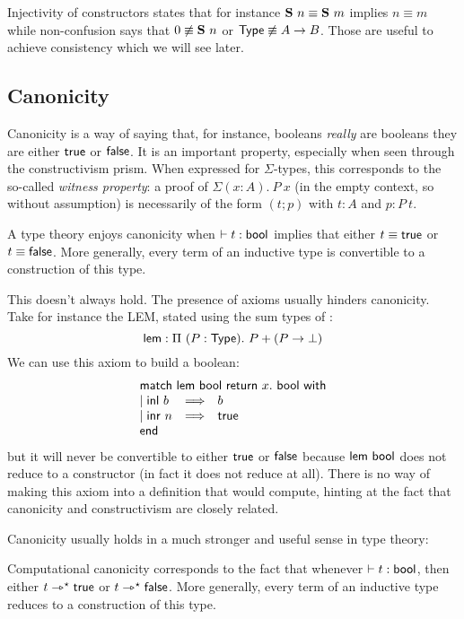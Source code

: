 Injectivity of constructors states that for instance
\(\mathbf{S}\ n \equiv \mathbf{S}\ m\) implies \(n \equiv m\) while non-confusion
says that \(0 \not\equiv \mathbf{S}\ n\) or \(\mathsf{Type} \not\equiv A \to B\).
Those are useful to achieve consistency which we will see later.

\subsection{Canonicity}

Canonicity is a way of saying that, for instance, booleans \emph{really} are
booleans \ie they are either \(\mathsf{true}\) or \(\mathsf{false}\).
It is an important property, especially when seen through the constructivism
prism.
When expressed for \(\Sigma\)-types, this corresponds to the so-called
\emph{witness property}: a proof of \(\Sigma (x:A).\ P\ x\) (in the empty
context, so without assumption) is necessarily of the form \((t;p)\)
with \(t : A\) and \(p : P\ t\).

\begin{definition}[Canonicity]
  A type theory enjoys canonicity when \(\vdash t : \mathsf{bool}\) implies that
  either \(t \equiv \mathsf{true}\) or \(t \equiv \mathsf{false}\).
  More generally, every term of an inductive type is convertible to a
  construction of this type.
\end{definition}

This doesn't always hold. The presence of axioms usually hinders canonicity.
Take for instance the \acrshort{LEM}, stated using the sum types of
:
%
\[
  \mathsf{lem} : \Pi\ (P : \mathsf{Type}).\ P + (P \to \bot)
\]
We can use this axiom to build a boolean:
\[
  \pmatch{\mathsf{lem}\ \bool}{x.\ \bool}{
    \branch{\inl\ b}{b} \\
    \branch{\inr\ n}{\ttrue}
  }
\]
but it will never be convertible to either \(\mathsf{true}\) or \(\mathsf{false}\) because
\(\mathsf{lem}\ \mathsf{bool}\) does not reduce to a constructor (in fact it does not
reduce at all).
There is no way of making this axiom into a definition that would compute,
hinting at the fact that canonicity and constructivism are closely related.

Canonicity usually holds in a much stronger and useful sense in type theory:

\begin{definition}
  Computational canonicity corresponds to the fact that whenever
  \(\vdash t : \mathsf{bool}\), then either \(t \rightarrowtriangle^{\star} \mathsf{true}\) or
  \(t \rightarrowtriangle^{\star} \mathsf{false}\).
  More generally, every term of an inductive type reduces to a construction
  of this type.
\end{definition}


